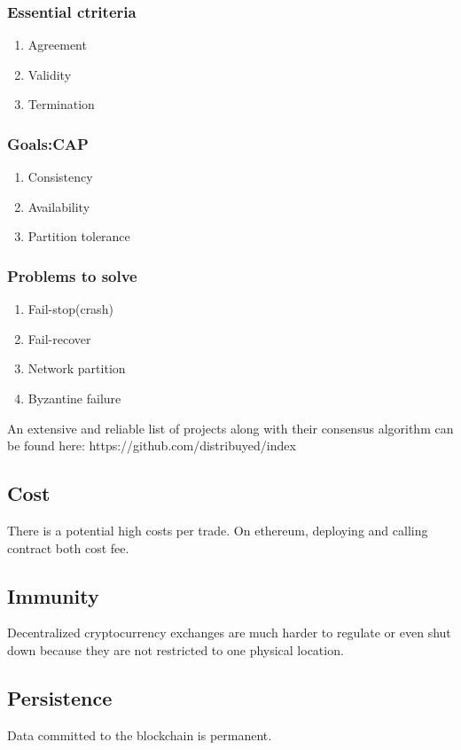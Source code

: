 \documentclass[]{article}
\begin{document}
	\subsubsection{Essential ctriteria}
	\begin{enumerate} 
	\item Agreement
	\item Validity 
	\item Termination
	\end{enumerate}
	\subsubsection{Goals:CAP}
	\begin{enumerate}  
	\item Consistency
	\item Availability	
	\item Partition tolerance
	\end{enumerate}
	\subsubsection{Problems to solve}
	\begin{enumerate} 
		\item Fail-stop(crash)
		\item Fail-recover
		\item Network partition
		\item Byzantine failure	
	\end{enumerate}

	 An extensive and reliable list of projects along with their consensus algorithm can be found here:
	 https://github.com/distribuyed/index
	 

	 \subsection{Cost}
	 There is a potential high costs per trade.
	 On ethereum, deploying and calling contract both cost fee. 
	 
	\subsection{Immunity}
	 Decentralized cryptocurrency exchanges are much harder 
	 to regulate or even shut down because they are not restricted 
	 to one physical location.
	\subsection{Persistence}  
	Data committed to the blockchain is permanent.\\
\end{document}
